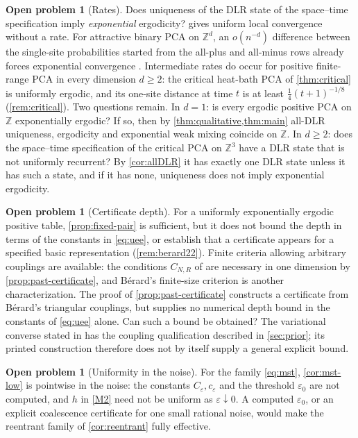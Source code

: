 \documentclass[11pt]{article}
\theoremstyle{plain}
\theoremstyle{definition}
\newtheorem{problem}[theorem]{Open problem}
\theoremstyle{remark}
\newcommand{\Z}{\mathbb{Z}}
\newcommand{\eps}{\varepsilon}
\begin{document}
\begin{problem}[Rates]
\label{prob:rate}
Does uniqueness of the DLR state of the space--time specification imply \emph{exponential} ergodicity?  gives uniform local convergence without a rate. For attractive binary PCA on $\Z^d$, an $o(n^{-d})$ difference between the single-site probabilities started from the all-plus and all-minus rows already forces exponential convergence \cite[Corollary~2, eq.~(4.10)]{MS93}. Intermediate rates do occur for positive finite-range PCA in every dimension $d\ge2$: the critical heat-bath PCA of \cref{thm:critical} is uniformly ergodic, and its one-site distance at time $t$ is at least $\frac14(t+1)^{-1/8}$ (\cref{rem:critical}). Two questions remain. In $d=1$: is every ergodic positive PCA on $\Z$ exponentially ergodic? If so, then by \cref{thm:qualitative,thm:main} all-DLR uniqueness, ergodicity and exponential weak mixing coincide on $\Z$. In $d\ge2$: does the space--time specification of the critical PCA on $\Z^3$ have a DLR state that is not uniformly recurrent? By \cref{cor:allDLR} it has exactly one DLR state unless it has such a state, and if it has none, uniqueness does not imply exponential ergodicity.
\end{problem}

\begin{problem}[Certificate depth]
\label{prob:depth}
For a uniformly exponentially ergodic positive table, \cref{prop:fixed-pair} is sufficient, but it does not bound the depth in terms of the constants in \eqref{eq:uee}, or establish that a certificate appears for a specified basic representation (\cref{rem:berard22}). Finite criteria allowing arbitrary couplings are available: the conditions $C_{N,R}$ of \cite{MS91} are necessary in one dimension by \cref{prop:past-certificate}, and B\'erard's finite-size criterion \cite[eq.~(5)]{Berard23} is another characterization. The proof of \cref{prop:past-certificate} constructs a certificate from B\'erard's triangular couplings, but supplies no numerical depth bound in the constants of \eqref{eq:uee} alone. Can such a bound be obtained? The variational converse stated in \cite[Theorem~2]{MS91} has the coupling qualification described in \cref{sec:prior}; its printed construction therefore does not by itself supply a general explicit bound.
\end{problem}

\begin{problem}[Uniformity in the noise]
\label{prob:mst}
For the family \eqref{eq:mst}, \cref{cor:mst-low} is pointwise in the noise: the constants $C_\eps,c_\eps$ and the threshold $\eps_0$ are not computed, and $h$ in \ref{M2} need not be uniform as $\eps\downarrow0$. A computed $\eps_0$, or an explicit coalescence certificate for one small rational noise, would make the reentrant family of \cref{cor:reentrant} fully effective.
\end{problem}
\end{document}

